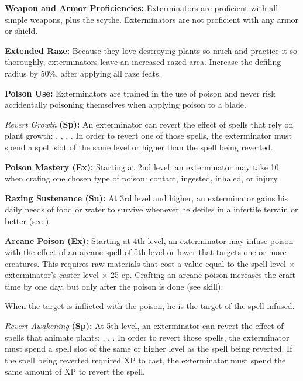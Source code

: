 {
\textbf{Weapon and Armor Proficiencies:} Exterminators are proficient with all simple  weapons, plus the scythe. Exterminators are not proficient with any armor or shield.

\textbf{Extended Raze:} Because they love destroying plants so much and practice it so thoroughly, exterminators leave an increased razed area. Increase the defiling radius by 50\%, after applying all raze feats.

\textbf{Poison Use:} Exterminators are trained in the use of poison and never risk accidentally poisoning themselves when applying poison to a blade.

\textit{Revert Growth} \textbf{(Sp):} An exterminator can revert the effect of spells that rely on plant growth: , , , . In order to revert one of those spells, the exterminator must spend a spell slot of the same level or higher than the spell being reverted.

\textbf{Poison Mastery (Ex):} Starting at 2nd level, an exterminator may take 10 when crafing one chosen type of poison: contact, ingested, inhaled, or injury.

\textbf{Razing Sustenance (Su):} At 3rd level and higher, an exterminator gains his daily needs of food or water to survive whenever he defiles in a infertile terrain or better (see ).

\textbf{Arcane Poison (Ex):} Starting at 4th level, an exterminator may infuse poison with the effect of an arcane spell of 5th-level or lower that targets one or more creatures. This requires raw materials that cost a value equal to the spell level $\times$ exterminator's caster level $\times$ 25 cp. Crafting an arcane poison increases the craft time by one day, but only after the poison is done (see  skill).

When the target is inflicted with the poison, he is the target of the spell infused.

\textit{Revert Awakening} \textbf{(Sp):} At 5th level, an exterminator can revert the effect of spells that animate plants: , , . In order to revert those spells, the exterminator must spend a spell slot of the same or higher level as the spell being reverted. If the spell being reverted required XP to cast, the exterminator must spend the same amount of XP to revert the spell.
}